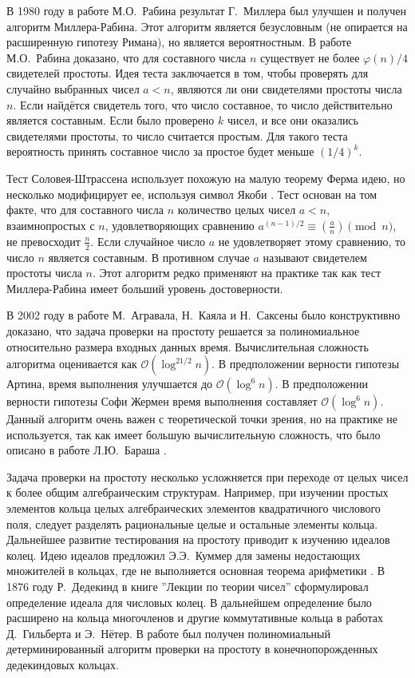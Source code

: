\documentclass[_00_dissertation.tex]{subfiles}
\begin{document}
В 1980 году в работе М.О.~Рабина \cite{source:Rabin} результат Г.~Миллера был улучшен и получен алгоритм Миллера-Рабина.
Этот алгоритм является безусловным (не опирается на расширенную гипотезу Римана), но является вероятностным.
В работе М.О.~Рабина доказано, что для составного числа $n$ существует не более $\varphi(n)/4$ свидетелей простоты.
Идея теста заключается в том, чтобы проверять для случайно выбранных чисел $a < n$, являются ли они свидетелями простоты числа $n$.
Если найдётся свидетель того, что число составное, то число действительно является составным.
Если было проверено $k$ чисел, и все они оказались свидетелями простоты, то число считается простым.
Для такого теста вероятность принять составное число за простое будет меньше $(1/4)^{k}$.

Тест Соловея-Штрассена использует похожую на малую теорему Ферма идею, но несколько модифицирует ее, используя символ Якоби \cite{source:Solovay}.
Тест основан на том факте, что для составного числа $n$ количество целых чисел $a < n$, взаимнопростых с $n$, удовлетворяющих сравнению $a^{{(n-1)/2}}\equiv \left({\frac{a}{n}}\right){\pmod{n}}$, не превосходит $\frac{n}{2}$.
Если случайное число $a$ не удовлетворяет этому сравнению, то число $n$ является составным.
В противном случае $a$ называют свидетелем простоты числа $n$.
Этот алгоритм редко применяют на практике так как тест Миллера-Рабина имеет больший уровень достоверности.

В 2002 году в работе М.~Агравала, Н.~Каяла и Н.~Саксены \cite{source:AKS} было конструктивно доказано, что задача проверки на простоту решается за полиномиальное относительно размера входных данных время.
Вычислительная сложность алгоритма оценивается как $\mathcal{O}(\log ^{21/2}n)$.
В предположении верности гипотезы Артина, время выполнения улучшается до $\mathcal{O}(\log ^{6}n)$.
В предположении верности гипотезы Софи Жермен время выполнения составляет $\mathcal{O}(\log ^{6}n)$.
Данный алгоритм очень важен с теоретической точки зрения, но на практике не используется, так как имеет большую вычислительную сложность, что было описано в работе Л.Ю.~Бараша \cite{source:Barash}.

Задача проверки на простоту несколько усложняется при переходе от целых чисел к более общим алгебраическим структурам.
Например, при изучении простых элементов кольца целых алгебраических элементов квадратичного числового поля, следует разделять рациональные целые и остальные элементы кольца.
Дальнейшее развитие тестирования на простоту приводит к изучению идеалов колец.
Идею идеалов предложил Э.Э.~Куммер для замены недостающих множителей в кольцах, где не выполняется основная теорема арифметики \cite{source:Stillwell}.
В 1876 году Р.~Дедекинд в книге ''Лекции по теории чисел'' \cite{source:Dedekind} сформулировал определение идеала для числовых колец.
В дальнейшем определение было расширено на кольца многочленов и другие коммутативные кольца в работах Д.~Гильберта и Э.~Нётер.
В работе \cite{source:Huang_Prime_in_P} был получен полиномиальный детерминированный алгоритм проверки на простоту в конечнопорожденных дедекиндовых кольцах. 
\end{document}
